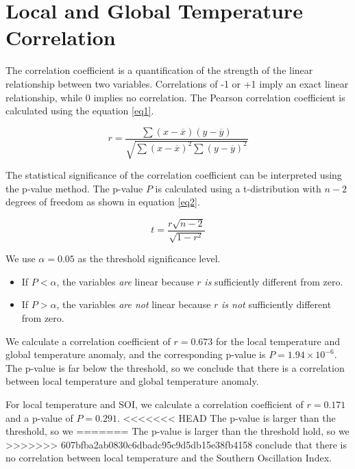 \documentclass[12pt]{article}
\begin{document}
\section*{Local and Global Temperature Correlation}
The correlation coefficient is a quantification of the
strength of the linear relationship between two variables.
Correlations of -1 or +1 imply an exact linear relationship,
while 0 implies no correlation.
The Pearson correlation coefficient is calculated using
the equation \ref{eq1}.

\begin{equation}\label{eq1}
 r = \frac{\sum (x - \overline{x}) (y - \overline{y})}
 {\sqrt{\sum (x - \overline{x})^2 \sum (y - \overline{y})^2}}
\end{equation}

The statistical significance of the correlation coefficient can be
interpreted using the p-value method.
The p-value $P$ is calculated using a t-distribution with
$n - 2$ degrees of freedom as shown in equation \ref{eq2}.

\begin{equation}\label{eq2}
 t = \frac{r \sqrt{n-2}}{\sqrt{1 - r^2}}
\end{equation}

We use $\alpha = 0.05$ as the threshold significance level.
\begin{itemize}
 \item If $P < \alpha$, the variables \textit{are}
 linear because $r$ \textit{is} sufficiently different from zero.
 \item If $P > \alpha$, the variables \textit{are not}
 linear because $r$ \textit{is not} sufficiently different from zero.
\end{itemize}

We calculate a correlation coefficient of $r = 0.673$ for
the local temperature and global temperature anomaly,
and the corresponding p-value is $P = 1.94 \times 10^{-6}$.
The p-value is far below the threshold, so we conclude that
there is a correlation between local temperature and
global temperature anomaly.

For local temperature and SOI, we calculate a correlation
coefficient of $r = 0.171$ and a p-value of $P = 0.291$.
<<<<<<< HEAD
The p-value is larger than the threshold, so we
=======
The p-value is larger than the threshold hold, so we
>>>>>>> 607bfba2ab0830c6dbadc95c9d5db15e38fb4158
conclude that there is no correlation between local temperature
and the Southern Oscillation Index.
\end{document}
